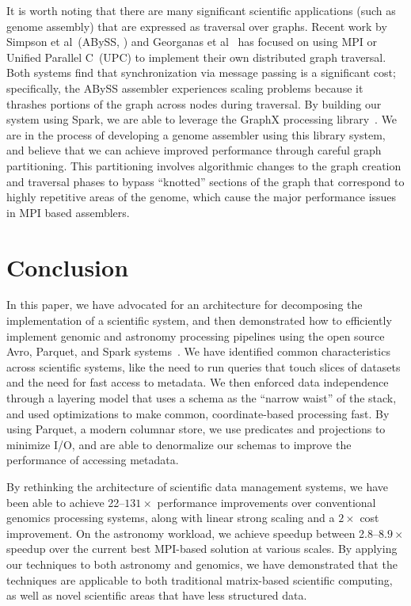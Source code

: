 \documentclass{acm_proc_article-sp}
\begin{document}
It is worth noting that there are many significant scientific applications (such as genome
assembly) that are expressed as traversal over graphs. Recent work by Simpson et al~(ABySS,
\cite{simpson09}) and Georganas et al~\cite{georganas14} has focused on using MPI
or Unified Parallel C~(UPC) to implement their own distributed graph traversal. Both systems
find that synchronization via message passing is a significant cost; specifically, the ABySS assembler
experiences scaling problems because it thrashes portions of the graph across nodes during traversal.
By building our system using Spark, we are able to leverage the GraphX processing library~\cite{gonzalez14,
xin13}. We are in the process of developing a genome assembler using this library system, and
believe that we can achieve improved performance through careful graph partitioning. This partitioning involves
algorithmic changes to the graph creation and traversal phases to bypass ``knotted'' sections of the
graph that correspond to highly repetitive areas of the genome, which cause the major performance
issues in MPI based assemblers.

\section{Conclusion}
\label{sec:conclusion}

In this paper, we have advocated for an architecture for decomposing the implementation of a scientific
system, and then demonstrated how to efficiently implement genomic and astronomy processing pipelines using
the open source Avro, Parquet, and Spark systems~\cite{avro, parquet, zaharia10}. We have identified common
characteristics across scientific systems, like the need to run queries that touch slices of datasets and the need
for fast access to metadata. We then enforced data independence through a layering model that uses a schema
as the ``narrow waist'' of the stack, and used optimizations to make common, coordinate-based processing
fast. By using Parquet, a modern columnar store, we use predicates and projections to minimize I/O, and are able
to denormalize our schemas to improve the performance of accessing metadata.

By rethinking the architecture of scientific data management systems, we have been able to achieve
22--$131\times$ performance improvements over conventional genomics processing systems, along with linear
strong scaling and a $2\times$ cost improvement. On the astronomy workload, we achieve speedup between
2.8--$8.9\times$ speedup over the current best MPI-based solution at various scales. By applying our techniques
to both astronomy and genomics, we have demonstrated that the techniques are applicable to both traditional
matrix-based scientific computing, as well as novel scientific areas that have less structured data.
\end{document}
